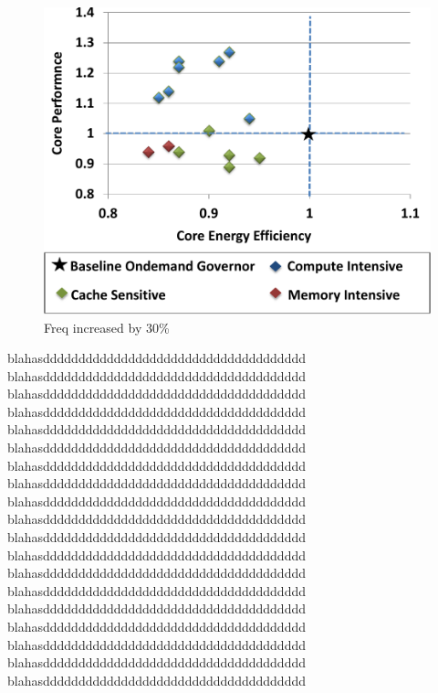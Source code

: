 \begin{figure}[h]
  \begin{center}
\includegraphics[width=\linewidth]{figs/ana-increase-crop.pdf}
  \end{center}
  \vspace{-0.1in}
  \caption{Freq increased by 30\%}
	\label{fig:increase-freq}
\end{figure}

blahasddddddddddddddddddddddddddddddddddddd
blahasddddddddddddddddddddddddddddddddddddd
blahasddddddddddddddddddddddddddddddddddddd
blahasddddddddddddddddddddddddddddddddddddd
blahasddddddddddddddddddddddddddddddddddddd
blahasddddddddddddddddddddddddddddddddddddd
blahasddddddddddddddddddddddddddddddddddddd
blahasddddddddddddddddddddddddddddddddddddd
blahasddddddddddddddddddddddddddddddddddddd
blahasddddddddddddddddddddddddddddddddddddd
blahasddddddddddddddddddddddddddddddddddddd
blahasddddddddddddddddddddddddddddddddddddd
blahasddddddddddddddddddddddddddddddddddddd
blahasddddddddddddddddddddddddddddddddddddd
blahasddddddddddddddddddddddddddddddddddddd
blahasddddddddddddddddddddddddddddddddddddd
blahasddddddddddddddddddddddddddddddddddddd
blahasddddddddddddddddddddddddddddddddddddd
blahasddddddddddddddddddddddddddddddddddddd





















